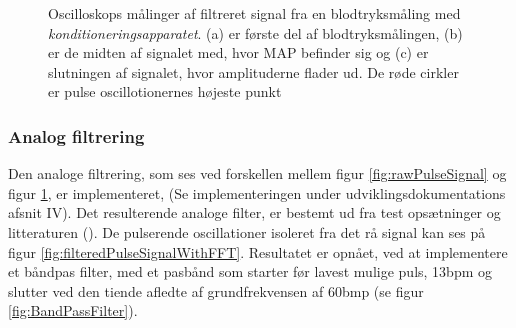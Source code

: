 \begin{figure}[H]
	\centering
	\caption{Oscilloskops målinger af filtreret signal fra en blodtryksmåling med \textit{konditioneringsapparatet}. (a) er første del af blodtryksmålingen, (b) er de midten af signalet med, hvor MAP befinder sig og (c) er slutningen af signalet, hvor amplituderne flader ud. De røde cirkler er pulse oscillotionernes højeste punkt}\label{fig:filteredPulseSignal}
\end{figure}

\subsubsection{Analog filtrering}
Den analoge filtrering, som ses ved forskellen mellem figur \ref{fig:rawPulseSignal} og figur \ref{fig:filteredPulseSignal}, er implementeret, (Se implementeringen under udviklingsdokumentations afsnit IV). 
Det resulterende analoge filter, er bestemt ud fra test opsætninger og litteraturen (\cite{RefWorks:8}). De pulserende oscillationer isoleret fra det rå signal kan ses på figur \ref{fig:filteredPulseSignalWithFFT}. Resultatet er opnået, ved at implementere et båndpas filter, med et pasbånd som starter før lavest mulige puls, 13bpm og slutter ved den tiende afledte af grundfrekvensen af 60bmp (se figur \ref*{fig:BandPassFilter}).

